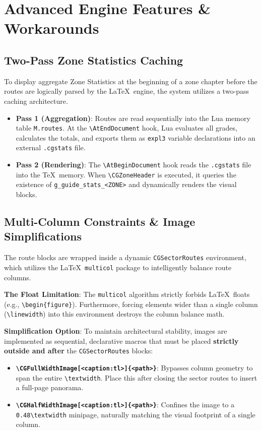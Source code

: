 \clearpage
\section{Advanced Engine Features \& Workarounds}

\subsection{Two-Pass Zone Statistics Caching}
To display aggregate Zone Statistics at the beginning of a zone chapter before the routes are logically parsed by the \LaTeX\ engine, the system utilizes a two-pass caching architecture.
\begin{itemize}
    \item \textbf{Pass 1 (Aggregation)}: Routes are read sequentially into the Lua memory table \texttt{M.routes}. At the \texttt{\textbackslash AtEndDocument} hook, Lua evaluates all grades, calculates the totals, and exports them as \texttt{expl3} variable declarations into an external \texttt{.cgstats} file.
    \item \textbf{Pass 2 (Rendering)}: The \texttt{\textbackslash AtBeginDocument} hook reads the \texttt{.cgstats} file into the \TeX\ memory. When \texttt{\textbackslash CGZoneHeader} is executed, it queries the existence of \texttt{g\_guide\_stats\_<ZONE>} and dynamically renders the visual blocks.
\end{itemize}

\subsection{Multi-Column Constraints \& Image Simplifications}
The route blocks are wrapped inside a dynamic \texttt{CGSectorRoutes} environment, which utilizes the \LaTeX\ \texttt{multicol} package to intelligently balance route columns.

\textbf{The Float Limitation}: The \texttt{multicol} algorithm strictly forbids \LaTeX\ floats (e.g., \texttt{\textbackslash begin\{figure\}}). Furthermore, forcing elements wider than a single column (\texttt{\textbackslash linewidth}) into this environment destroys the column balance math.

\textbf{Simplification Option}: To maintain architectural stability, images are implemented as sequential, declarative macros that must be placed \textbf{strictly outside and after} the \texttt{CGSectorRoutes} blocks:
\begin{itemize}
    \item \textbf{\texttt{\textbackslash CGFullWidthImage[<caption:tl>]\{<path>\}}}: Bypasses column geometry to span the entire \texttt{\textbackslash textwidth}. Place this after closing the sector routes to insert a full-page panorama.
    \item \textbf{\texttt{\textbackslash CGHalfWidthImage[<caption:tl>]\{<path>\}}}: Confines the image to a \texttt{0.48\textbackslash textwidth} minipage, naturally matching the visual footprint of a single column.
\end{itemize}

